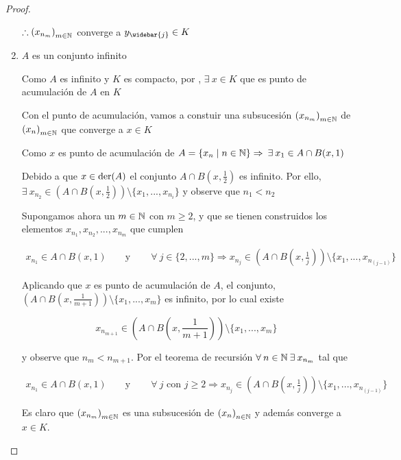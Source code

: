 \begin{proof}
\begin{enumerate}
        $\therefore {\left( x_{n_m}\right)}_{m \in \mathbb{N}}$ converge a $y_{\widebar{j}} \in K$
        
        \item $A$ es un conjunto infinito 

        Como $A$ es infinito y $K$ es compacto, por , $\exists \: x \in K$ que es punto de acumulación de $A$ en $K$

        Con el punto de acumulación, vamos a constuir una subsucesión ${\left( x_{n_m}\right)}_{m \in \mathbb{N}}$ de ${\left( x_n \right)}_{m \in \mathbb{N}}$ que converge a $x \in K$

        Como $x$ es punto de acumulación de $A = \{ x_n \mid n \in \mathbb{N} \} \Rightarrow \: \exists \: x_1 \in A \cap B(x,1)$

        Debido a que $x \in \mathrm{der}(A)$ el conjunto $ A \cap B\left(x, \frac{1}{2}\right)$ es infinito. Por ello, $\exists \: x_{n_2} \in \left(  A \cap B\left(x, \frac{1}{2}\right) \right) \setminus \{ x_1, ..., x_{n_i} \}$ y observe que $n_1 < n_2$

        Supongamos ahora un $m \in \mathbb{N}$ con $m \geqslant 2$, y que se tienen construidos los elementos $x_{n_1}, x_{n_2}, ..., x_{n_m}$ que cumplen

        \begin{align*}
         x_{n_1} \in A \cap B(x, 1)   && \text{ y } && \: \forall \: j \in  \{ 2 , ..., m \} \Rightarrow x_{n_j} \in  \left(  A \cap B\left(x, \frac{1}{j}\right) \right) \setminus \{ x_1, ..., x_{n_{(j-1)}} \}
        \end{align*}

        Aplicando que $x$ es punto de acumulación de $A$, el conjunto, $\left(  A \cap B\left(x, \frac{1}{m+1}\right) \right) \setminus \{ x_1, ..., x_{m} \}$ es infinito, por lo cual existe 

        $$x_{n_{m+1}} \in \left(  A \cap B\left(x, \frac{1}{m+1}\right) \right) \setminus \{ x_1, ..., x_{m} \}$$

         y observe que $n_m < n_{m+1}$. Por el teorema de recursión $\forall \: n \in \mathbb{N} \: \exists \: x_{n_m}$ tal que 

         \begin{align*}
         x_{n_1} \in A \cap B(x, 1)   && \text{ y } && \: \forall \: j \text{ con } j \geqslant 2 \Rightarrow x_{n_j} \in  \left(  A \cap B\left(x, \frac{1}{j}\right) \right) \setminus \{ x_1, ..., x_{n_{(j-1)}} \}
        \end{align*}

        Es claro que ${\left( x_{n_m} \right)}_{m \in \mathbb{N}}$ es una subsucesión de ${\left( x_{n} \right)}_{n \in \mathbb{N}}$ y además converge a $x \in K$.


\end{enumerate}
\end{proof}

